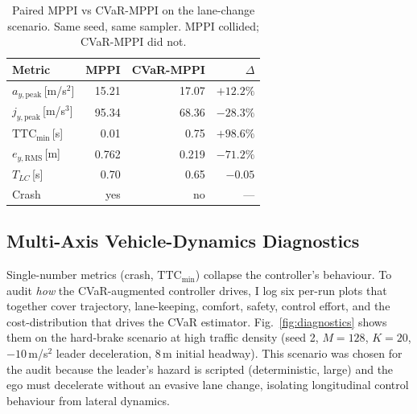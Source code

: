 \documentclass[letterpaper, 10 pt, conference]{ieeeconf}
\begin{document}
\begin{table}[t]
\centering
\caption{Paired MPPI vs CVaR-MPPI on the lane-change scenario. Same seed, same sampler. MPPI collided; CVaR-MPPI did not.}
\label{tab:headtohead}
\begin{tabular}{lrrr}
\toprule
Metric & MPPI & CVaR-MPPI & $\Delta$ \\
\midrule
$a_{y,\mathrm{peak}}$\,[m/s$^2$]   & 15.21 & 17.07 & $+12.2\%$ \\
$j_{y,\mathrm{peak}}$\,[m/s$^3$]   & 95.34 & 68.36 & $-28.3\%$ \\
$\mathrm{TTC}_\mathrm{min}$\,[s]   & 0.01  & 0.75  & $+98.6\%$ \\
$e_{y,\mathrm{RMS}}$\,[m]          & 0.762 & 0.219 & $-71.2\%$ \\
$T_{LC}$\,[s]                      & 0.70  & 0.65  & $-0.05$ \\
\midrule
Crash                              & yes   & no    & ---  \\
\bottomrule
\end{tabular}
\end{table}

\subsection{Multi-Axis Vehicle-Dynamics Diagnostics}
\label{sec:diagnostics}

Single-number metrics (crash, $\mathrm{TTC}_\mathrm{min}$) collapse the controller's behaviour. To audit \emph{how} the CVaR-augmented controller drives, I log six per-run plots that together cover trajectory, lane-keeping, comfort, safety, control effort, and the cost-distribution that drives the CVaR estimator. Fig.~\ref{fig:diagnostics} shows them on the hard-brake scenario at high traffic density (seed 2, $M=128$, $K=20$, $-10$\,m/s$^2$ leader deceleration, 8\,m initial headway). This scenario was chosen for the audit because the leader's hazard is scripted (deterministic, large) and the ego must decelerate without an evasive lane change, isolating longitudinal control behaviour from lateral dynamics.
\end{document}
